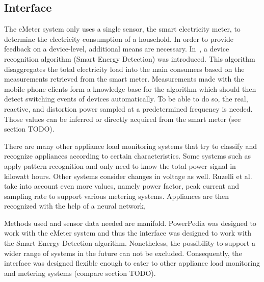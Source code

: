 \subsection{Interface}
The eMeter system only uses a single sensor, the smart electricity meter, to determine the electricity consumption of a household. In order to provide feedback on a device-level, additional means are necessary. In~\cite{helfensteinsed}, a device recognition algorithm (Smart Energy Detection) was introduced. This algorithm disaggregates the total electricity load into the main consumers based on the measurements retrieved from the smart meter. Measurements made with the mobile phone clients form a knowledge base for the algorithm which should then detect switching events of devices automatically. To be able to do so, the real, reactive, and distortion power sampled at a predetermined frequency is needed. Those values can be inferred or directly acquired from the smart meter (see section TODO).

There are many other appliance load monitoring systems that try to classify and recognize appliances according to certain characteristics. 
Some systems such as~\cite{Farinaccio1999245} apply pattern recognition and only need to know the total power signal in kilowatt hours. Other systems consider changes in voltage as well\cite{hart}. Ruzelli et al.\cite{RuzzelliNSO10} take into account even more values, namely power factor, peak current and sampling rate to support various metering systems. Appliances are then recognized with the help of a neural network, 

Methods used and sensor data needed are manifold. PowerPedia was designed to work with the eMeter system and thus the interface was designed to work with the Smart Energy Detection algorithm. Nonetheless, the possibility to support a wider range of systems in the future can not be excluded. Consequently, the interface was designed flexible enough to cater to other appliance load monitoring and metering systems (compare section TODO).

